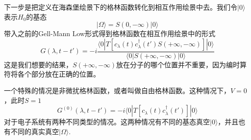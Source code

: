 \documentclass[a4paper,14pt]{article}
\begin{document}
下一步是把定义在海森堡绘景下的格林函数转化到相互作用绘景中去。我们令$|0\rangle$表示$H_0$的基态
\begin{equation*}
    |\Omega\rangle=S(0,-\infty)|0\rangle
\end{equation*}
带入之前的Gell-Mann Low形式得到格林函数在相互作用绘景中的形式
\begin{equation*}
    G(\lambda,t-t')=-i\frac{\langle0|T[c_\lambda(t)c_\lambda^\dagger(t')S(+\infty,-\infty)]|0\rangle}{\langle0|S(+\infty,-\infty)|0\rangle}
\end{equation*}
这是我们想要的结果，$S(+\infty,-\infty)$放在分子的哪个位置并不重要，因为编时算符将各个部分放在正确的位置。

一个特殊的情况是非微扰格林函数，或者叫做自由格林函数。这种情况下，$V=0$，此时$S=1$
\begin{equation*}
    G^{(0)}(\lambda,t-t')=-i\langle 0|T[c_\lambda(t)c_\lambda^\dagger(t')]|0\rangle
\end{equation*}
对于电子系统有两种不同类型的情况。这两种情况有不同的基态真空$|0\rangle$，并且也有不同的真实真空$|\Omega\rangle$.
\end{document}
